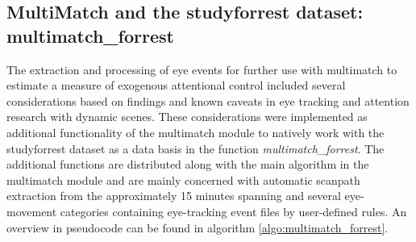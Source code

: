 \documentclass[a4paper, 12pt]{scrreprt}
\begin{document}
\subsection{MultiMatch and the studyforrest dataset: multimatch\_forrest}
The extraction and processing of eye events for further use with multimatch to estimate a measure of exogenous attentional control included several considerations based on findings and known caveats in eye tracking and attention research with dynamic scenes. These considerations were implemented as additional functionality of the multimatch module to natively work with the studyforrest dataset as a data basis in the function \textit{multimatch\_forrest}. The additional functions are distributed along with the main algorithm in the multimatch module and are mainly concerned with automatic scanpath extraction from the approximately 15 minutes spanning and several eye-movement categories containing eye-tracking event files by user-defined rules. An overview in pseudocode can be found in algorithm \ref{algo:multimatch_forrest}. \newline
\end{document}
